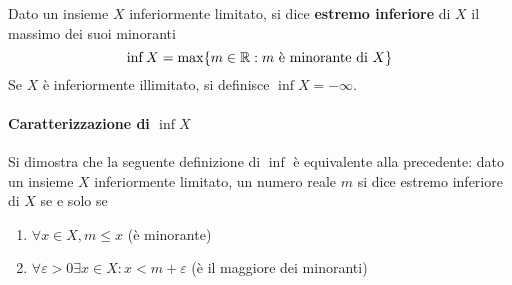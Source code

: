 \documentclass{book}     %
\begin{document}
\begin{boxdef}
    Dato un insieme $X$ inferiormente limitato, si dice \textbf{estremo inferiore} di $X$ il massimo dei suoi minoranti
    \[\inf X = \max\{m\in \mathbb{R} : m \text{ è minorante di }X\}\]
    Se $X$ è inferiormente illimitato, si definisce $\inf X = -\infty$.
\end{boxdef}
\paragraph{Caratterizzazione di $\inf X$}
Si dimostra che la seguente definizione di $\inf$ è equivalente alla precedente: dato un insieme $X$ inferiormente limitato, un numero reale $m$ si dice estremo inferiore di $X$ se e solo se 
\begin{enumerate}[label={\roman*)}]
    \item $\forall x\in X, m\leq x $ (è minorante)
    \item $\forall \varepsilon >0 \exists x\in X: x<m+\varepsilon$ (è il maggiore dei minoranti)
\end{enumerate}
\end{document}
